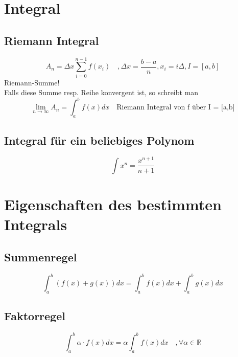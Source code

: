 



\section{Integral}
\subsection{Riemann Integral}
\[ \boxed{A_n = \Delta x \sum_{i=0}^{n-1} f(x_i) \quad 
, \Delta x = \frac{b - a}{n} , x_i = i \Delta , I = [a,b]} \]
Riemann-Summe! \\
Falls diese Summe resp. Reihe konvergent ist, so schreibt man
\[ \boxed{\lim_{n \rightarrow \infty} A_n = \int_{a}^{b} f(x) d x \quad 
\text{Riemann Integral von f über I = [a,b]} } \]

\subsection{Integral für ein beliebiges Polynom}
\[ \boxed{\int x^n = \frac{x^{n + 1}}{n + 1}} \]

\section{Eigenschaften des bestimmten Integrals}

\subsection{Summenregel}
\[ \boxed{\int_a^b (f(x) + g(x)) dx = \int_a^b f(x) dx + \int_a^b g(x) dx} \]

\subsection{Faktorregel}
\[ \boxed{\int_a^b \alpha \cdot f(x) dx = \alpha \int_a^b f(x) dx \quad , 
\forall \alpha \in \mathbb{R}} \]

